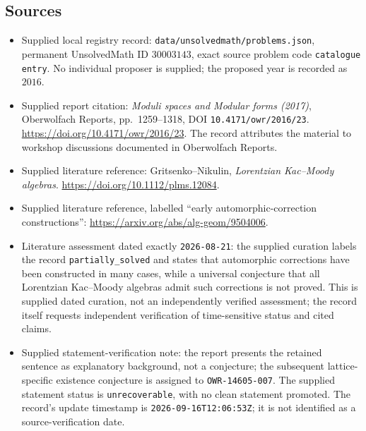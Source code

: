 \documentclass[11pt]{article}
\begin{document}
\subsection{Sources}
\begin{itemize}
\item Supplied local registry record: \texttt{data/unsolvedmath/problems.json}, permanent UnsolvedMath ID \(30003143\), exact source problem code \texttt{catalogue entry}. No individual proposer is supplied; the proposed year is recorded as \(2016\).
\item Supplied report citation: \emph{Moduli spaces and Modular forms (2017)}, Oberwolfach Reports, pp.~1259--1318, DOI \texttt{10.4171/owr/2016/23}. \url{https://doi.org/10.4171/owr/2016/23}. The record attributes the material to workshop discussions documented in Oberwolfach Reports.
\item Supplied literature reference: Gritsenko--Nikulin, \emph{Lorentzian Kac--Moody algebras}. \url{https://doi.org/10.1112/plms.12084}.
\item Supplied literature reference, labelled ``early automorphic-correction constructions'': \url{https://arxiv.org/abs/alg-geom/9504006}.
\item Literature assessment dated exactly \texttt{2026-08-21}: the supplied curation labels the record \texttt{partially\_solved} and states that automorphic corrections have been constructed in many cases, while a universal conjecture that all Lorentzian Kac--Moody algebras admit such corrections is not proved. This is supplied dated curation, not an independently verified assessment; the record itself requests independent verification of time-sensitive status and cited claims.
\item Supplied statement-verification note: the report presents the retained sentence as explanatory background, not a conjecture; the subsequent lattice-specific existence conjecture is assigned to \texttt{OWR-14605-007}. The supplied statement status is \texttt{unrecoverable}, with no clean statement promoted. The record's update timestamp is \texttt{2026-09-16T12:06:53Z}; it is not identified as a source-verification date.
\end{itemize}
\end{document}
